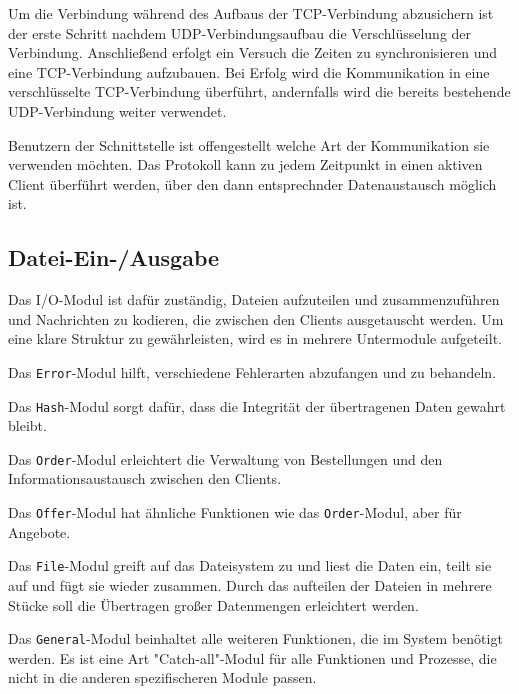 Um die Verbindung während des Aufbaus der TCP-Verbindung abzusichern ist der erste Schritt nachdem UDP-Verbindungsaufbau die Verschlüsselung der Verbindung. Anschließend erfolgt ein Versuch die Zeiten zu synchronisieren und eine TCP-Verbindung aufzubauen. Bei Erfolg wird die Kommunikation in eine verschlüsselte TCP-Verbindung überführt, andernfalls wird die bereits bestehende UDP-Verbindung weiter verwendet.

Benutzern der Schnittstelle ist offengestellt welche Art der Kommunikation sie verwenden möchten. Das Protokoll kann zu jedem Zeitpunkt in einen aktiven Client überführt werden, über den dann entsprechnder Datenaustausch möglich ist.

\subsection{Datei-Ein-/Ausgabe}
Das I/O-Modul ist dafür zuständig, Dateien aufzuteilen und zusammenzuführen und Nachrichten zu kodieren, die zwischen den Clients ausgetauscht werden. Um eine klare Struktur zu gewährleisten, wird es in mehrere Untermodule aufgeteilt.

Das \texttt{Error}-Modul hilft, verschiedene Fehlerarten abzufangen und zu behandeln.

Das \texttt{Hash}-Modul sorgt dafür, dass die Integrität der übertragenen Daten gewahrt bleibt.

Das \texttt{Order}-Modul erleichtert die Verwaltung von Bestellungen und den Informationsaustausch zwischen den Clients.

Das \texttt{Offer}-Modul hat ähnliche Funktionen wie das \texttt{Order}-Modul, aber für Angebote.

Das \texttt{File}-Modul greift auf das Dateisystem zu und liest die Daten ein, teilt sie auf und fügt sie wieder zusammen. Durch das aufteilen der Dateien in mehrere Stücke soll die Übertragen großer Datenmengen erleichtert werden.

Das \texttt{General}-Modul beinhaltet alle weiteren Funktionen, die im System benötigt werden. Es ist eine Art "Catch-all"-Modul für alle Funktionen und Prozesse, die nicht in die anderen spezifischeren Module passen.
